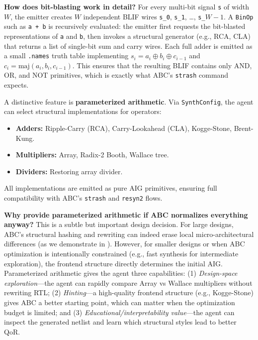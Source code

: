 \documentclass[11pt]{article}
\begin{document}
\textbf{How does bit-blasting work in detail?} For every multi-bit signal \texttt{s} of width $W$, the emitter creates $W$ independent BLIF wires \texttt{s\_0}, \texttt{s\_1}, \dots, \texttt{s\_\(W-1\)}. A \texttt{BinOp} such as \texttt{a + b} is recursively evaluated: the emitter first requests the bit-blasted representations of \texttt{a} and \texttt{b}, then invokes a structural generator (e.g., RCA, CLA) that returns a list of single-bit sum and carry wires. Each full adder is emitted as a small \texttt{.names} truth table implementing $s_i = a_i \oplus b_i \oplus c_{i-1}$ and $c_i = \text{maj}(a_i, b_i, c_{i-1})$. This ensures that the resulting BLIF contains only AND, OR, and NOT primitives, which is exactly what ABC's \texttt{strash} command expects.

A distinctive feature is \textbf{parameterized arithmetic}. Via \texttt{SynthConfig}, the agent can select structural implementations for operators:

\begin{itemize}
    \item \textbf{Adders:} Ripple-Carry (RCA), Carry-Lookahead (CLA), Kogge-Stone, Brent-Kung.
    \item \textbf{Multipliers:} Array, Radix-2 Booth, Wallace tree.
    \item \textbf{Dividers:} Restoring array divider.
\end{itemize}

All implementations are emitted as pure AIG primitives, ensuring full compatibility with ABC's \texttt{strash} and \texttt{resyn2} flows.

\textbf{Why provide parameterized arithmetic if ABC normalizes everything anyway?} This is a subtle but important design decision. For large designs, ABC's structural hashing and rewriting can indeed erase local micro-architectural differences (as we demonstrate in ). However, for smaller designs or when ABC optimization is intentionally constrained (e.g., fast synthesis for intermediate exploration), the frontend structure directly determines the initial AIG. Parameterized arithmetic gives the agent three capabilities: (1) \textit{Design-space exploration}---the agent can rapidly compare Array vs Wallace multipliers without rewriting RTL; (2) \textit{Hinting}---a high-quality frontend structure (e.g., Kogge-Stone) gives ABC a better starting point, which can matter when the optimization budget is limited; and (3) \textit{Educational/interpretability value}---the agent can inspect the generated netlist and learn which structural styles lead to better QoR.
\end{document}
